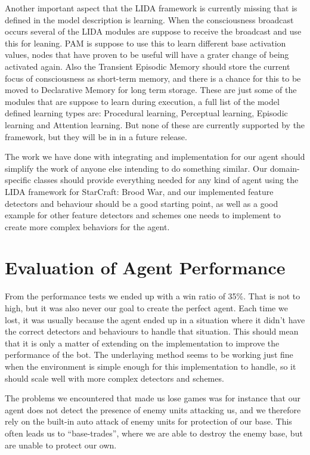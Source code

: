 Another important aspect that the LIDA framework is currently missing that is defined in the model description is learning. When the consciousness broadcast occurs several of the LIDA modules are suppose to receive the broadcast and use this for leaning. PAM is suppose to use this to learn different base activation values, nodes that have proven to be useful will have a grater change of being activated again. Also the Transient Episodic Memory should store the current focus of consciousness as short-term memory, and there is a chance for this to be moved to Declarative Memory for long term storage. These are just some of the modules that are suppose to learn during execution, a full list of the model defined learning types are: Procedural learning, Perceptual learning, Episodic learning and Attention learning. But none of these are currently supported by the framework, but they will be in in a future release.

The work we have done with integrating and  implementation for our agent should simplify the work of anyone else intending to do something similar. Our domain-specific classes should provide everything needed for any kind of agent using the LIDA framework for StarCraft: Brood War, and our implemented feature detectors and behaviour should be a good starting point, as well as a good example for other feature detectors and schemes one needs to implement to create more complex behaviors for the agent.

\section{Evaluation of Agent Performance}
\label{sec:evalperf}
From the performance tests we ended up with a win ratio of 35\%. That is not to high, but it was also never our goal to create the perfect agent. Each time we lost, it was usually because the agent ended up in a situation where it didn't have the correct detectors and behaviours to handle that situation. This should mean that it is only a matter of extending on the implementation to improve the performance of the bot. The underlaying method seems to be working just fine when the environment is simple enough for this implementation to handle, so it should scale well with more complex detectors and schemes.

The problems we encountered that made us lose games was for instance that our agent does not detect the presence of enemy units attacking us, and we therefore rely on the built-in auto attack of enemy units for protection of our base. This often leads us to ``base-trades'', where we are able to destroy the enemy base, but are unable to protect our own.

